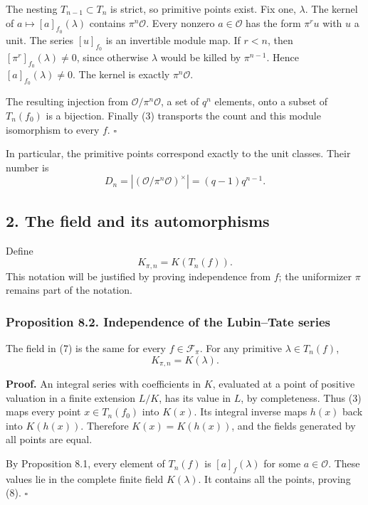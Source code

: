\documentclass[11pt,a4paper]{article}
\begin{document}
The nesting \(T_{n-1}\subset T_n\) is strict, so primitive points exist.
Fix one, \(\lambda\). The kernel of \(a\mapsto[a]_{f_0}(\lambda)\)
contains \(\pi^n\mathcal O\). Every nonzero \(a\in\mathcal O\) has the
form \(\pi^r u\) with \(u\) a unit. The series \([u]_{f_0}\) is an
invertible module map. If \(r<n\), then \([\pi^r]_{f_0}(\lambda)\ne0\),
since otherwise \(\lambda\) would be killed by \(\pi^{n-1}\). Hence
\([a]_{f_0}(\lambda)\ne0\). The kernel is exactly \(\pi^n\mathcal O\).

The resulting injection from \(\mathcal O/\pi^n\mathcal O\), a set of
\(q^n\) elements, onto a subset of \(T_n(f_0)\) is a bijection. Finally
(3) transports the count and this module isomorphism to every \(f\).
\(\square\)

In particular, the primitive points correspond exactly to the unit
classes. Their number is \[
D_n=|(\mathcal O/\pi^n\mathcal O)^\times|
      =(q-1)q^{n-1}.
\tag{6}
\]

\subsection{2. The field and its
automorphisms}\label{the-field-and-its-automorphisms}

Define \[
K_{\pi,n}=K(T_n(f)).
\tag{7}
\] This notation will be justified by proving independence from \(f\);
the uniformizer \(\pi\) remains part of the notation.

\subsubsection{Proposition 8.2. Independence of the Lubin--Tate
series}\label{proposition-8.2.-independence-of-the-lubintate-series}

The field in (7) is the same for every \(f\in\mathcal F_\pi\). For any
primitive \(\lambda\in T_n(f)\), \[
K_{\pi,n}=K(\lambda).
\tag{8}
\]

\textbf{Proof.} An integral series with coefficients in \(K\), evaluated
at a point of positive valuation in a finite extension \(L/K\), has its
value in \(L\), by completeness. Thus (3) maps every point
\(x\in T_n(f_0)\) into \(K(x)\). Its integral inverse maps \(h(x)\) back
into \(K(h(x))\). Therefore \(K(x)=K(h(x))\), and the fields generated
by all points are equal.

By Proposition 8.1, every element of \(T_n(f)\) is \([a]_f(\lambda)\)
for some \(a\in\mathcal O\). These values lie in the complete finite
field \(K(\lambda)\). It contains all the points, proving (8).
\(\square\)
\end{document}
